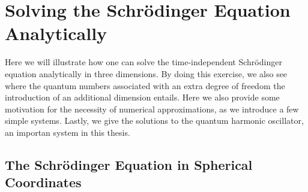 \chapter{Solving the Schrödinger Equation Analytically}
\label{app:analytical_tise}

Here we will illustrate how one can solve the time-independent Schrödinger
equation analytically in three dimensions. By doing this exercise, we also see
where the quantum numbers associated with an extra degree of freedom the
introduction of an additional dimension entails. Here we also provide some 
motivation for the necessity of numerical approximations, as we introduce a 
few simple systems. Lastly, we give the solutions to the quantum harmonic 
oscillator, an importan system in this thesis.

\section{The Schrödinger Equation in Spherical Coordinates}

